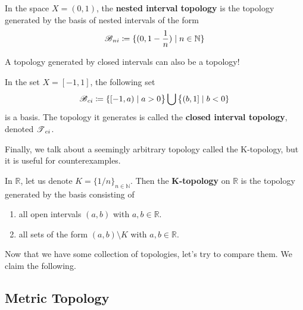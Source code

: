   \begin{example}
    In the space $X = (0,1)$, the \textbf{nested interval topology} is the topology generated by the basis of nested intervals of the form 
    \begin{equation}
      \B_{ni} \coloneqq \{ (0, 1-\frac{1}{n}) \mid n \in \mathbb{N} \}
    \end{equation}
  \end{example}

  A topology generated by closed intervals can also be a topology! 

  \begin{example}
    In the set $X = [-1, 1]$, the following set 
    \begin{equation}
      \B_{ci} \coloneqq \{ [-1, a) \mid a > 0 \big\} \bigcup \big\{ (b, 1] \mid b<0 \}
    \end{equation}
    is a basis. The topology it generates is called the \textbf{closed interval topology}, denoted $\T_{ci}$. 
  \end{example}

  Finally, we talk about a seemingly arbitrary topology called the K-topology, but it is useful for counterexamples.   

  \begin{example}[K-Topology]
    In $\mathbb{R}$, let us denote $K = \{1/n\}_{n \in \mathbb{N}}$. Then the \textbf{K-topology} on $\mathbb{R}$ is the topology generated by the basis consisting of 
    \begin{enumerate}
      \item all open intervals $(a, b)$ with $a, b \in \mathbb{R}$. 
      \item all sets of the form $(a, b) \setminus K$ with $a, b \in \mathbb{R}$. 
    \end{enumerate}
  \end{example} 

  Now that we have some collection of topologies, let's try to compare them. We claim the following. 

  \begin{theorem}
    
  \end{theorem}

\subsection{Metric Topology}

